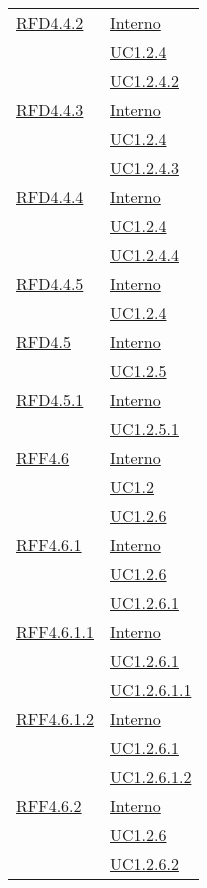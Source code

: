 \begin{longtable}{|>{\centering}m{5cm}|m{5cm}<{\centering}|}
\hyperlink{RFD4.4.2}{RFD4.4.2} & \hyperlink{Interno}{Interno}\\
& \hyperref[UC1.2.4]{UC1.2.4}\\
& \hyperref[UC1.2.4.2]{UC1.2.4.2}\\ \hline
\hyperlink{RFD4.4.3}{RFD4.4.3} & \hyperlink{Interno}{Interno}\\
& \hyperref[UC1.2.4]{UC1.2.4}\\
& \hyperref[UC1.2.4.3]{UC1.2.4.3}\\ \hline
\hyperlink{RFD4.4.4}{RFD4.4.4} & \hyperlink{Interno}{Interno}\\
& \hyperref[UC1.2.4]{UC1.2.4}\\
& \hyperref[UC1.2.4.4]{UC1.2.4.4}\\ \hline
\hyperlink{RFD4.4.5}{RFD4.4.5} & \hyperlink{Interno}{Interno}\\
& \hyperref[UC1.2.4]{UC1.2.4}\\ \hline
\hyperlink{RFD4.5}{RFD4.5} & \hyperlink{Interno}{Interno}\\
& \hyperref[UC1.2.5]{UC1.2.5}\\ \hline
\hyperlink{RFD4.5.1}{RFD4.5.1} & \hyperlink{Interno}{Interno}\\
& \hyperref[UC1.2.5.1]{UC1.2.5.1}\\ \hline
\hyperlink{RFF4.6}{RFF4.6} & \hyperlink{Interno}{Interno}\\
& \hyperref[UC1.2]{UC1.2}\\
& \hyperref[UC1.2.6]{UC1.2.6}\\ \hline
\hyperlink{RFF4.6.1}{RFF4.6.1} & \hyperlink{Interno}{Interno}\\
& \hyperref[UC1.2.6]{UC1.2.6}\\
& \hyperref[UC1.2.6.1]{UC1.2.6.1}\\ \hline
\hyperlink{RFF4.6.1.1}{RFF4.6.1.1} & \hyperlink{Interno}{Interno}\\
& \hyperref[UC1.2.6.1]{UC1.2.6.1}\\
& \hyperref[UC1.2.6.1.1]{UC1.2.6.1.1}\\ \hline
\hyperlink{RFF4.6.1.2}{RFF4.6.1.2} & \hyperlink{Interno}{Interno}\\
& \hyperref[UC1.2.6.1]{UC1.2.6.1}\\
& \hyperref[UC1.2.6.1.2]{UC1.2.6.1.2}\\ \hline
\hyperlink{RFF4.6.2}{RFF4.6.2} & \hyperlink{Interno}{Interno}\\
& \hyperref[UC1.2.6]{UC1.2.6}\\
& \hyperref[UC1.2.6.2]{UC1.2.6.2}\\ \hline

\end{longtable}
